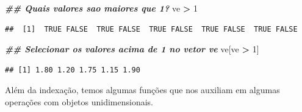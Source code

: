 \documentclass[
]{article}
\newenvironment{Shaded}{\begin{snugshade}}{\end{snugshade}}
\newcommand{\DecValTok}[1]{\textcolor[rgb]{0.00,0.00,0.81}{#1}}
\newcommand{\DocumentationTok}[1]{\textcolor[rgb]{0.56,0.35,0.01}{\textbf{\textit{#1}}}}
\newcommand{\NormalTok}[1]{#1}
\newcommand{\SpecialCharTok}[1]{\textcolor[rgb]{0.81,0.36,0.00}{\textbf{#1}}}
\begin{document}
\begin{Shaded}
\begin{Highlighting}[]
\DocumentationTok{\#\# Quais valores sao maiores que 1?}
\NormalTok{ve }\SpecialCharTok{\textgreater{}} \DecValTok{1}
\end{Highlighting}
\end{Shaded}

\begin{verbatim}
##  [1]  TRUE FALSE  TRUE FALSE  TRUE FALSE  TRUE FALSE  TRUE FALSE
\end{verbatim}

\begin{Shaded}
\begin{Highlighting}[]
\DocumentationTok{\#\# Selecionar os valores acima de 1 no vetor ve}
\NormalTok{ve[ve }\SpecialCharTok{\textgreater{}} \DecValTok{1}\NormalTok{]}
\end{Highlighting}
\end{Shaded}

\begin{verbatim}
## [1] 1.80 1.20 1.75 1.15 1.90
\end{verbatim}

Além da indexação, temos algumas funções que nos auxiliam em algumas operações com objetos unidimensionais.
\end{document}

